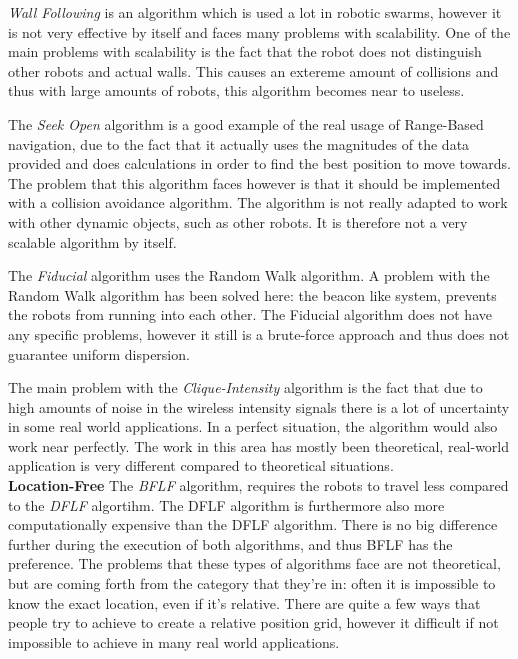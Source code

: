   \emph{Wall Following} is an algorithm which is used a lot in robotic swarms, however it is not very effective by itself and faces many problems with scalability.  One of the main problems with scalability is the fact that the robot does not distinguish other robots and actual walls. This causes an extereme amount of collisions and thus with large amounts of robots, this algorithm becomes near to useless. 

  The \emph{Seek Open} algorithm is a good example of the real usage of Range-Based navigation, due to the fact that it actually uses the magnitudes of the data provided and does calculations in order to find the best position to move towards. The problem that this algorithm faces however is that it should be implemented with a collision avoidance algorithm. The algorithm is not really adapted to work with other dynamic objects, such as other robots. It is therefore not a very scalable algorithm by itself.

  The \emph{Fiducial} algorithm uses the Random Walk algorithm. A problem with the Random Walk algorithm has been solved here: the beacon like system, prevents the robots from running into each other. The Fiducial algorithm does not have any specific problems, however it still is a brute-force approach and thus does not guarantee uniform dispersion.

  The main problem with the \emph{Clique-Intensity} algorithm is the fact that due to high amounts of noise in the wireless intensity signals there is a lot of uncertainty in some real world applications. In a perfect situation, the algorithm would also work near perfectly. The work in this area has mostly been theoretical, real-world application is very different compared to theoretical situations.\\

  \textbf{Location-Free}
  The \emph{BFLF} algorithm, requires the robots to travel less compared to the \emph{DFLF} algortihm. The DFLF algorithm is furthermore also more computationally expensive than the DFLF algorithm. There is no big difference further during the execution of both algorithms, and thus BFLF has the preference. The problems that these types of algorithms face are not theoretical, but are coming forth from the category that they're in: often it is impossible to know the exact location, even if it's relative. There are quite a few ways that people try to achieve to create a relative position grid, however it difficult if not impossible to achieve in many real world applications.\\

